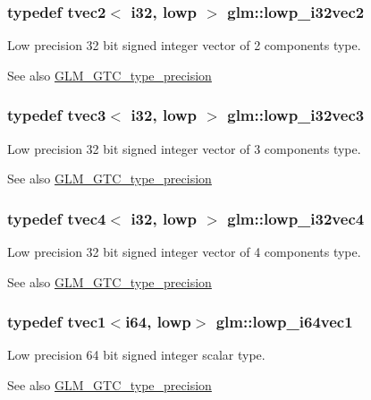 \subsubsection[{lowp\+\_\+i32vec2}]{\setlength{\rightskip}{0pt plus 5cm}typedef tvec2$<$ {\bf i32}, lowp $>$ {\bf glm\+::lowp\+\_\+i32vec2}}\label{namespaceglm_a9212b569bc55c19da61025470e90a906}
Low precision 32 bit signed integer vector of 2 components type. \begin{DoxySeeAlso}{See also}
\hyperlink{group__gtc__type__precision}{G\+L\+M\+\_\+\+G\+T\+C\+\_\+type\+\_\+precision} 
\end{DoxySeeAlso}
\hypertarget{namespaceglm_a9c9cf334ddb9af22d2b46ba718db1391}{}
\subsubsection[{lowp\+\_\+i32vec3}]{\setlength{\rightskip}{0pt plus 5cm}typedef tvec3$<$ {\bf i32}, lowp $>$ {\bf glm\+::lowp\+\_\+i32vec3}}\label{namespaceglm_a9c9cf334ddb9af22d2b46ba718db1391}
Low precision 32 bit signed integer vector of 3 components type. \begin{DoxySeeAlso}{See also}
\hyperlink{group__gtc__type__precision}{G\+L\+M\+\_\+\+G\+T\+C\+\_\+type\+\_\+precision} 
\end{DoxySeeAlso}
\hypertarget{namespaceglm_adf58b40a2a5c28c72dc8171e8e204499}{}
\subsubsection[{lowp\+\_\+i32vec4}]{\setlength{\rightskip}{0pt plus 5cm}typedef tvec4$<$ {\bf i32}, lowp $>$ {\bf glm\+::lowp\+\_\+i32vec4}}\label{namespaceglm_adf58b40a2a5c28c72dc8171e8e204499}
Low precision 32 bit signed integer vector of 4 components type. \begin{DoxySeeAlso}{See also}
\hyperlink{group__gtc__type__precision}{G\+L\+M\+\_\+\+G\+T\+C\+\_\+type\+\_\+precision} 
\end{DoxySeeAlso}
\hypertarget{namespaceglm_ab6d7801f963fafdce3a8096901e902ad}{}
\subsubsection[{lowp\+\_\+i64vec1}]{\setlength{\rightskip}{0pt plus 5cm}typedef tvec1$<${\bf i64}, lowp$>$ {\bf glm\+::lowp\+\_\+i64vec1}}\label{namespaceglm_ab6d7801f963fafdce3a8096901e902ad}
Low precision 64 bit signed integer scalar type. \begin{DoxySeeAlso}{See also}
\hyperlink{group__gtc__type__precision}{G\+L\+M\+\_\+\+G\+T\+C\+\_\+type\+\_\+precision} 
\end{DoxySeeAlso}
\hypertarget{namespaceglm_ac8e2d710b3b859c4609821d77fd0d5e4}{}

